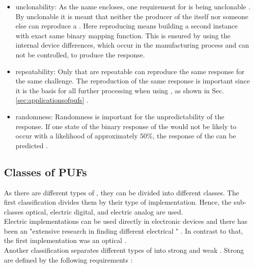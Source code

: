\begin{itemize}
\item unclonability: As the name \puf encloses, one requirement for \pufs is being unclonable \cite{Tajik2014PhysicalPUFs}.
By unclonable it is meant that neither the producer of the \puf itself nor someone else can reproduce a \puf.
Here reproducing means building a second instance with exact same binary mapping function.
This is ensured by using the internal device differences, which occur in the manufacturing process and can not be controlled, to produce the \puf response.
\item repeatability: Only \pufs that are repeatable can reproduce the same response for the same challenge.
The reproduction of the same response is important since it is the basis for all further processing when using \pufs, as shown in Sec. \ref{sec:applicationsofpufs} \cite{Armknecht2011AFunctions}.
\item randomness: Randomness is important for the unpredictability of the \puf response.
If one state of the binary response of the \puf would not be likely to occur with a likelihood of approximately $50 \%$, the response of the \puf can be predicted \cite{CherifJouini2011PerformanceStatistics}.
\end{itemize}



\subsection{Classes of PUFs}
\label{sec:classesofpufs}

As there are different types of \pufs, they can be divided into different classes.
The first classification divides them by their type of implementation.
Hence, the sub-classes optical, electric digital, and electric analog are used.\\
Electric implementations can be used directly in electronic devices and there has been an "extensive research in finding different electrical \pufs" \cite{Becker2015ThePUFs}.
In contrast to that, the first \puf implementation was an optical \puf.\\
Another classification separates different types of \pufs into strong and weak \pufs.
Strong \pufs are defined by the following requirements \cite{Ruhrmair2013PUFsEvaluations}:

